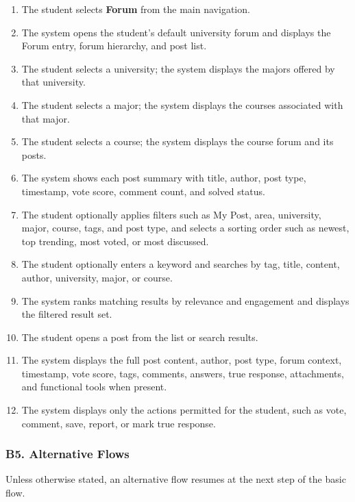 \documentclass[12pt]{article}
\begin{document}
\begin{enumerate}
\item The student selects \textbf{Forum} from the main navigation.
\item The system opens the student's default university forum and displays the Forum entry, forum hierarchy, and post list.
\item The student selects a university; the system displays the majors offered by that university.
\item The student selects a major; the system displays the courses associated with that major.
\item The student selects a course; the system displays the course forum and its posts.
\item The system shows each post summary with title, author, post type, timestamp, vote score, comment count, and solved status.
\item The student optionally applies filters such as My Post, area, university, major, course, tags, and post type, and selects a sorting order such as newest, top trending, most voted, or most discussed.
\item The student optionally enters a keyword and searches by tag, title, content, author, university, major, or course.
\item The system ranks matching results by relevance and engagement and displays the filtered result set.
\item The student opens a post from the list or search results.
\item The system displays the full post content, author, post type, forum context, timestamp, vote score, tags, comments, answers, true response, attachments, and functional tools when present.
\item The system displays only the actions permitted for the student, such as vote, comment, save, report, or mark true response.
\end{enumerate}
\par\medskip

\hypertarget{sec:b5-alternative-flows}{}
\subsubsection*{B5. Alternative Flows}
\par\medskip

Unless otherwise stated, an alternative flow resumes at the next step of the basic flow.
\par\medskip
\end{document}
